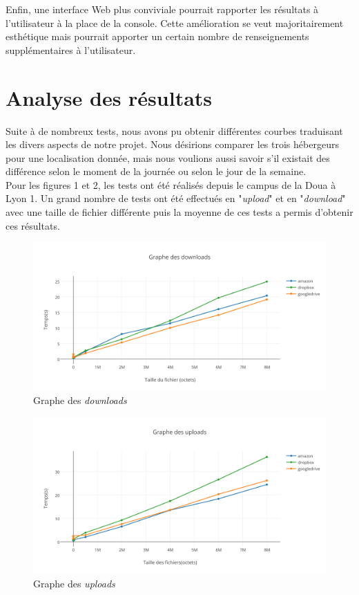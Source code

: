 \documentclass[10pt]{article}
\begin{document}
Enfin, une interface Web plus conviviale pourrait rapporter les résultats à
l'utilisateur à la place de la console. Cette amélioration se veut
majoritairement esthétique mais pourrait apporter un certain nombre de
renseignements supplémentaires à l'utilisateur.

\section{Analyse des résultats}

Suite à de nombreux tests, nous avons pu obtenir différentes courbes traduisant
les divers aspects de notre projet. Nous désirions comparer les trois hébergeurs
pour une localisation donnée, mais nous voulions aussi savoir s'il existait des
différence selon le moment de la journée ou selon le jour de la semaine.\\

Pour les figures 1 et 2, les tests ont été réalisés depuis le campus de la Doua
à Lyon 1. Un grand nombre de tests ont été effectués en "\textit{upload}" et en
"\textit{download}" avec une taille de fichier différente puis la moyenne de ces
tests a permis d'obtenir ces résultats.

\begin{figure}[h] \centering
\includegraphics[scale=0.7]{graphe_des_downloads.png} \caption{Graphe des
\textit{downloads}} \end{figure}

\newpage

\begin{figure}[h] \centering \includegraphics[scale=0.7]{graphe_des_uploads.png}
\caption{Graphe des \textit{uploads}} \end{figure}
\end{document}
